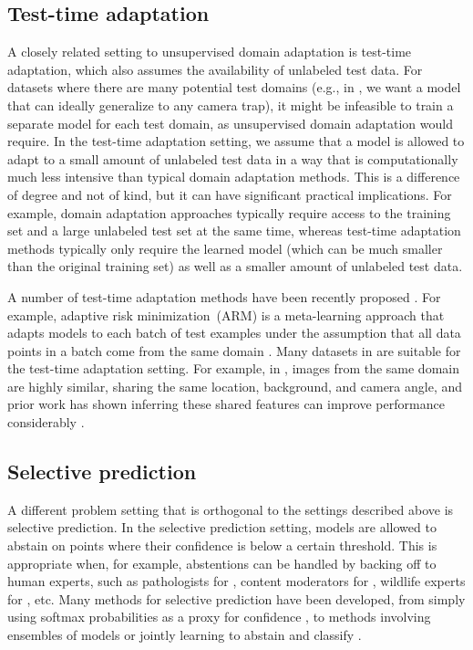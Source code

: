 \subsection{Test-time adaptation}
A closely related setting to unsupervised domain adaptation is test-time adaptation, which also assumes the availability of unlabeled test data.
For datasets where there are many potential test domains (e.g., in \iWildCam, we want a model that can ideally generalize to any camera trap), it might be infeasible to train a separate model for each test domain, as unsupervised domain adaptation would require.
In the test-time adaptation setting, we assume that a model is allowed to adapt to a small amount of unlabeled test data in a way that is computationally much less intensive than typical domain adaptation methods.
This is a difference of degree and not of kind, but it can have significant practical implications. For example, domain adaptation approaches typically require access to the training set and a large  unlabeled test set at the same time, whereas test-time adaptation methods typically only require the learned model (which can be much smaller than the original training set) as well as a smaller amount of unlabeled test data.

A number of test-time adaptation methods have been recently proposed
\citep{li17iclrw,sun2020test,wang20}.
For example, adaptive risk minimization~(ARM) is a meta-learning approach that adapts models to each batch of test examples under the assumption that all data points in a batch come from the same domain \citep{zhang2020adaptive}.
Many datasets in \Wilds are suitable for the test-time adaptation setting.
For example, in \iWildCam, images from the same domain are highly similar, sharing the same location, background, and camera angle, and prior work has shown inferring these shared features can improve performance considerably \citep{beery2020context}.


\subsection{Selective prediction}
A different problem setting that is orthogonal to the settings described above is selective prediction.
In the selective prediction setting, models are allowed to abstain on points where their confidence is below a certain threshold.
This is appropriate when, for example, abstentions can be handled by backing off to human experts, such as pathologists for \Camelyon, content moderators for \CivilComments, wildlife experts for \iWildCam, etc.
Many methods for selective prediction have been developed, from simply using softmax probabilities as a proxy for confidence \citep{cordella1995method,geifman2017selective},
to methods involving ensembles of models \citep{gal2016dropout,lakshminarayanan2017simple,geifman2018bias}
or jointly learning to abstain and classify \citep{bartlett2008classification, geifman2019selectivenet, feng2019selective}.

